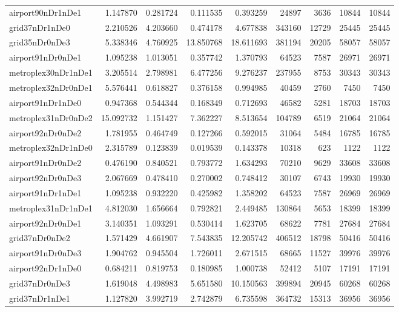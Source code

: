 \begin{longtable}{|l|r|r|r|r|r|r|r|r|}
airport90nDr1nDe1 & 1.147870 & 0.281724 & 0.111535 & 0.393259 & 24897 & 3636 & 10844 & 10844 \\
grid37nDr1nDe0 & 2.210526 & 4.203660 & 0.474178 & 4.677838 & 343160 & 12729 & 25445 & 25445 \\
grid35nDr0nDe3 & 5.338346 & 4.760925 & 13.850768 & 18.611693 & 381194 & 20205 & 58057 & 58057 \\
airport91nDr0nDe1 & 1.095238 & 1.013051 & 0.357742 & 1.370793 & 64523 & 7587 & 26971 & 26971 \\
metroplex30nDr1nDe1 & 3.205514 & 2.798981 & 6.477256 & 9.276237 & 237955 & 8753 & 30343 & 30343 \\
metroplex32nDr0nDe1 & 5.576441 & 0.618827 & 0.376158 & 0.994985 & 40459 & 2760 & 7450 & 7450 \\
airport91nDr1nDe0 & 0.947368 & 0.544344 & 0.168349 & 0.712693 & 46582 & 5281 & 18703 & 18703 \\
metroplex31nDr0nDe2 & 15.092732 & 1.151427 & 7.362227 & 8.513654 & 104789 & 6519 & 21064 & 21064 \\
airport92nDr0nDe2 & 1.781955 & 0.464749 & 0.127266 & 0.592015 & 31064 & 5484 & 16785 & 16785 \\
metroplex32nDr1nDe0 & 2.315789 & 0.123839 & 0.019539 & 0.143378 & 10318 & 623 & 1122 & 1122 \\
airport91nDr0nDe2 & 0.476190 & 0.840521 & 0.793772 & 1.634293 & 70210 & 9629 & 33608 & 33608 \\
airport92nDr0nDe3 & 2.067669 & 0.478410 & 0.270002 & 0.748412 & 30107 & 6743 & 19930 & 19930 \\
airport91nDr1nDe1 & 1.095238 & 0.932220 & 0.425982 & 1.358202 & 64523 & 7587 & 26969 & 26969 \\
metroplex31nDr1nDe1 & 4.812030 & 1.656664 & 0.792821 & 2.449485 & 130864 & 5653 & 18399 & 18399 \\
airport92nDr0nDe1 & 3.140351 & 1.093291 & 0.530414 & 1.623705 & 68622 & 7781 & 27684 & 27684 \\
grid37nDr0nDe2 & 1.571429 & 4.661907 & 7.543835 & 12.205742 & 406512 & 18798 & 50416 & 50416 \\
airport91nDr0nDe3 & 1.904762 & 0.945504 & 1.726011 & 2.671515 & 68665 & 11527 & 39976 & 39976 \\
airport92nDr1nDe0 & 0.684211 & 0.819753 & 0.180985 & 1.000738 & 52412 & 5107 & 17191 & 17191 \\
grid37nDr0nDe3 & 1.619048 & 4.498983 & 5.651580 & 10.150563 & 399894 & 20945 & 60268 & 60268 \\
grid37nDr1nDe1 & 1.127820 & 3.992719 & 2.742879 & 6.735598 & 364732 & 15313 & 36956 & 36956 \\

\end{longtable}
